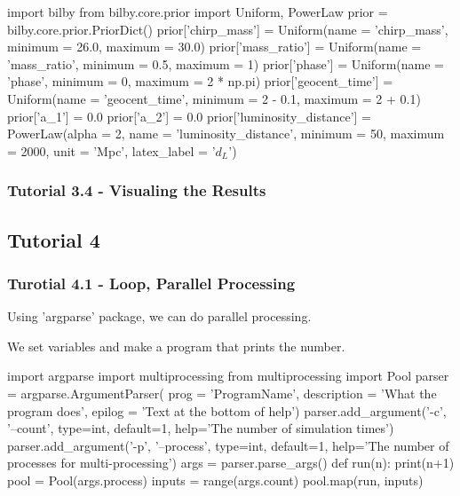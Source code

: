 \begin{python}[python3]
    import bilby
    from bilby.core.prior import Uniform, PowerLaw
    prior = bilby.core.prior.PriorDict()
    prior['chirp_mass'] = Uniform(name = 'chirp_mass',
                                  minimum = 26.0,
                                  maximum = 30.0)
    prior['mass_ratio'] = Uniform(name = 'mass_ratio',
                                  minimum = 0.5,
                                  maximum = 1)
    prior['phase'] = Uniform(name = 'phase',
                             minimum = 0,
                             maximum = 2 * np.pi)
    prior['geocent_time'] = Uniform(name = 'geocent_time',
                                    minimum = 2 - 0.1,
                                    maximum = 2 + 0.1)
    prior['a_1'] = 0.0
    prior['a_2'] = 0.0
    prior['luminosity_distance'] = PowerLaw(alpha = 2,
                                            name = 'luminosity_distance',
                                            minimum = 50,
                                            maximum = 2000,
                                            unit = 'Mpc',
                                            latex_label = '$d_L$')
\end{python}

\subsubsection{Tutorial 3.4 - Visualing the Results}

\subsection{Tutorial 4}
\subsubsection{Turotial 4.1 - Loop, Parallel Processing}

Using 'argparse' package, we can do parallel processing.

We set variables and make a program that prints the number.

\begin{python}[python3]
    import argparse
    import multiprocessing
    from multiprocessing import Pool
    parser = argparse.ArgumentParser(
        prog = 'ProgramName',
        description = 'What the program does',
        epilog = 'Text at the bottom of help')
    parser.add_argument('-c',
                        '--count',
                        type=int,
                        default=1,
                        help='The number of simulation times')
    parser.add_argument('-p',
                    '--process',
                    type=int,
                    default=1,
                    help='The number of processes for multi-processing')
    args = parser.parse_args()
    def run(n):
        print(n+1)
    pool = Pool(args.process)
    inputs = range(args.count)
    pool.map(run, inputs)
\end{python}

